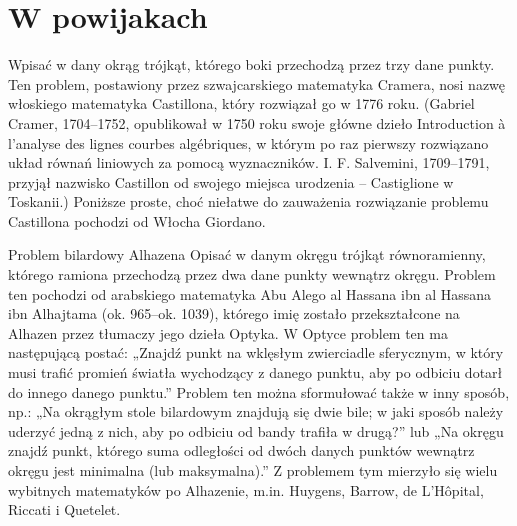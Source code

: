 \documentclass{greaseproof}
\begin{document}
\section{W powijakach}

Wpisać w dany okrąg trójkąt, którego boki przechodzą przez trzy dane punkty.
Ten problem, postawiony przez szwajcarskiego matematyka Cramera, nosi nazwę włoskiego matematyka Castillona, który rozwiązał go w 1776 roku.
(Gabriel Cramer, 1704–1752, opublikował w 1750 roku swoje główne dzieło Introduction à l’analyse des lignes courbes algébriques, w którym po raz pierwszy rozwiązano układ równań liniowych za pomocą wyznaczników.
I. F. Salvemini, 1709–1791, przyjął nazwisko Castillon od swojego miejsca urodzenia – Castiglione w Toskanii.)
Poniższe proste, choć niełatwe do zauważenia rozwiązanie problemu Castillona pochodzi od Włocha Giordano.

Problem bilardowy Alhazena
Opisać w danym okręgu trójkąt równoramienny, którego ramiona przechodzą przez dwa dane punkty wewnątrz okręgu.
Problem ten pochodzi od arabskiego matematyka Abu Alego al Hassana ibn al Hassana ibn Alhajtama (ok. 965–ok. 1039), którego imię zostało przekształcone na Alhazen przez tłumaczy jego dzieła Optyka.
W Optyce problem ten ma następującą postać:
„Znajdź punkt na wklęsłym zwierciadle sferycznym, w który musi trafić promień światła wychodzący z danego punktu, aby po odbiciu dotarł do innego danego punktu.”
Problem ten można sformułować także w inny sposób, np.:
„Na okrągłym stole bilardowym znajdują się dwie bile; w jaki sposób należy uderzyć jedną z nich, aby po odbiciu od bandy trafiła w drugą?”
lub
„Na okręgu znajdź punkt, którego suma odległości od dwóch danych punktów wewnątrz okręgu jest minimalna (lub maksymalna).”
Z problemem tym mierzyło się wielu wybitnych matematyków po Alhazenie, m.in. Huygens, Barrow, de L’Hôpital, Riccati i Quetelet.



{}


\raggedright
{}
\printindex

\printindex[persons]
\end{document}
